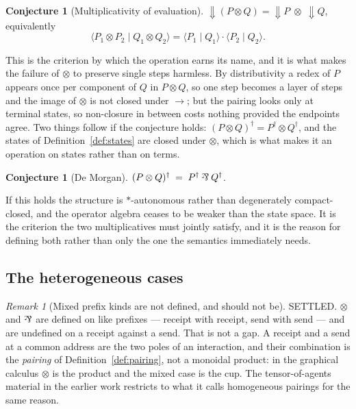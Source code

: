 \documentclass[11pt]{article}
\theoremstyle{definition}
\newtheorem{conjecture}[theorem]{Conjecture}
\theoremstyle{remark}
\newtheorem{remark}[theorem]{Remark}
\newcommand{\red}{\ensuremath{\rightarrow}}
\newcommand{\parr}{\mathbin{\rotatebox[origin=c]{180}{\&}}}
\begin{document}
\begin{conjecture}[Multiplicativity of evaluation]
\label{conj:mult}
$\Downarrow(P \otimes Q) = \Downarrow\!P \;\otimes\; \Downarrow\!Q$, equivalently
\[
  \langle P_1 \otimes P_2 \mid Q_1 \otimes Q_2 \rangle
  = \langle P_1 \mid Q_1 \rangle \cdot \langle P_2 \mid Q_2 \rangle .
\]
\end{conjecture}

This is the criterion by which the operation earns its name, and it is what
makes the failure of $\otimes$ to preserve single steps harmless. By
distributivity a redex of $P$ appears once per component of $Q$ in $P \otimes Q$,
so one step becomes a layer of steps and the image of $\otimes$ is not closed
under $\red$; but the pairing looks only at terminal states, so non-closure in
between costs nothing provided the endpoints agree. Two things follow if the
conjecture holds: $(P \otimes Q)^{\dagger} = P^{\dagger} \otimes Q^{\dagger}$,
and the states of Definition~\ref{def:states} are closed under $\otimes$, which
is what makes it an operation on states rather than on terms.

\begin{conjecture}[De Morgan]
\label{conj:demorgan}
$(P \otimes Q)^{\dagger} \;=\; P^{\dagger} \parr Q^{\dagger}$.
\end{conjecture}

If this holds the structure is $*$-autonomous rather than degenerately
compact-closed, and the operator algebra ceases to be weaker than the state
space. It is the criterion the two multiplicatives must jointly satisfy, and it
is the reason for defining both rather than only the one the semantics
immediately needs.

\subsection{The heterogeneous cases}

\begin{remark}[Mixed prefix kinds are not defined, and should not be]
\label{rem:mixed}
SETTLED. $\otimes$ and $\parr$ are defined on like prefixes --- receipt with
receipt, send with send --- and are undefined on a receipt against a send. That
is not a gap. A receipt and a send at a common address are the two poles of an
interaction, and their combination is the \emph{pairing} of
Definition~\ref{def:pairing}, not a monoidal product: in the graphical calculus
$\otimes$ is the product and the mixed case is the cup. The tensor-of-agents
material in the earlier work restricts to what it calls homogeneous pairings for
the same reason.
\end{remark}
\end{document}
